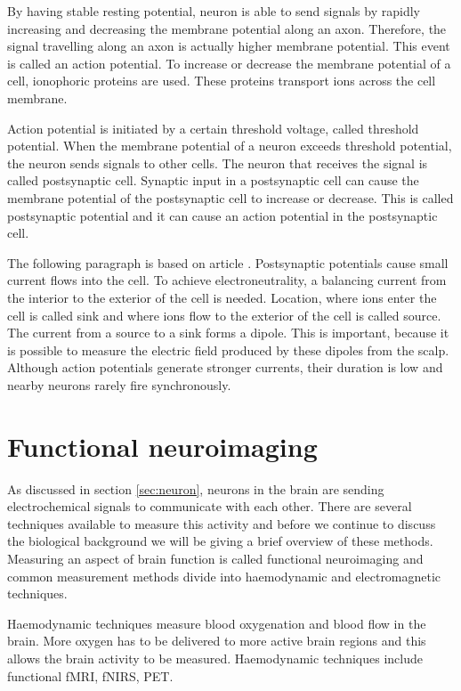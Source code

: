 By having stable resting potential, neuron is able to send signals by rapidly increasing and decreasing the membrane potential along an axon. Therefore, the signal travelling along an axon is actually higher membrane potential. This event is called an action potential. To increase or decrease the membrane potential of a cell, ionophoric proteins are used. These proteins transport ions across the cell membrane.

Action potential is initiated by a certain threshold voltage, called threshold potential. When the membrane potential of a neuron exceeds threshold potential, the neuron sends signals to other cells. The neuron that receives the signal is called postsynaptic cell. Synaptic input in a postsynaptic cell can cause the membrane potential of the postsynaptic cell to increase or decrease. This is called postsynaptic potential and it can cause an action potential in the postsynaptic cell.

The following paragraph is based on article \cite{electric_field}. Postsynaptic potentials cause small current flows into the cell. To achieve electroneutrality, a balancing current from the interior to the exterior of the cell is needed. Location, where ions enter the cell is called sink and where ions flow to the exterior of the cell is called source. The current from a source to a sink forms a dipole. This is important, because it is possible to measure the electric field produced by these dipoles from the scalp. Although action potentials generate stronger currents, their duration is low and nearby neurons rarely fire synchronously.

\section{Functional neuroimaging}
\label{sec:neuroimaging}

As discussed in section \ref{sec:neuron}, neurons in the brain are sending electrochemical signals to communicate with each other. There are several techniques available to measure this activity and before we continue to discuss the biological background we will be giving a brief overview of these methods. Measuring an aspect of brain function is called functional neuroimaging and common measurement methods divide into haemodynamic and electromagnetic techniques.

Haemodynamic techniques measure blood oxygenation and blood flow in the brain. More oxygen has to be delivered to more active brain regions and this allows the brain activity to be measured. Haemodynamic techniques include functional \acrfull{fMRI}, \acrfull{fNIRS}, \acrfull{PET}.

